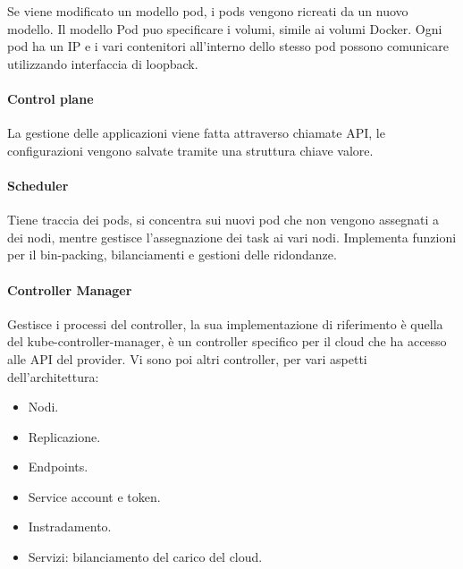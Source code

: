 \documentclass{article}
\begin{document}
		Se viene modificato un modello pod, i pods vengono ricreati da un nuovo modello. Il modello Pod puo specificare i volumi, simile ai volumi Docker. Ogni pod ha un IP e i vari contenitori all'interno dello stesso pod possono comunicare utilizzando interfaccia di loopback.
		
		\paragraph{Control plane}
		La gestione delle applicazioni viene fatta attraverso chiamate API, le configurazioni vengono salvate tramite una struttura chiave valore.
		
		\paragraph{Scheduler}
		Tiene traccia dei pods, si concentra sui nuovi pod che non vengono assegnati a dei nodi, mentre gestisce l'assegnazione dei task ai vari nodi. Implementa funzioni per il bin-packing, bilanciamenti e gestioni delle ridondanze.\\
		
		\paragraph{Controller Manager}
		Gestisce i processi del controller, la sua implementazione di riferimento è quella del kube-controller-manager, è un controller specifico per il cloud che ha accesso alle API del provider. Vi sono poi altri controller, per vari aspetti dell'architettura:
		\begin{itemize}
		    \item Nodi.
		    \item Replicazione.
		    \item Endpoints.
		    \item Service account e token.
		    \item Instradamento.
		    \item Servizi: bilanciamento del carico del cloud.
		\end{itemize}
		
		\newpage
\end{document}
